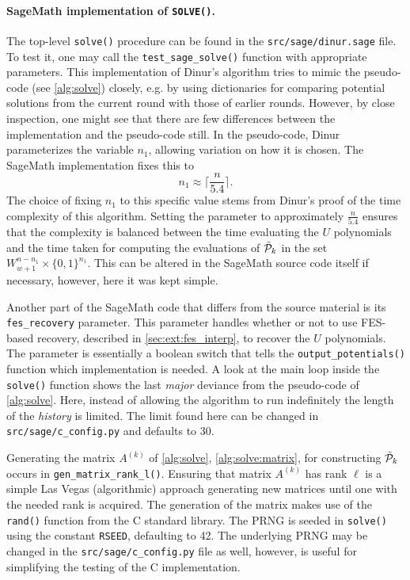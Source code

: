 \paragraph{SageMath implementation of \texttt{SOLVE()}.} The top-level \texttt{solve()} procedure can be found in the \texttt{src/sage/dinur.sage} file. To test it, one may call the \texttt{test\_sage\_solve()} function with appropriate parameters. This implementation of Dinur's algorithm tries to mimic the pseudo-code (see \cref{alg:solve}) closely, e.g. by using dictionaries for comparing potential solutions from the current round with those of earlier rounds. However, by close inspection, one might see that there are few differences between the implementation and the pseudo-code still. In the pseudo-code, Dinur parameterizes the variable $n_1$, allowing variation on how it is chosen. The SageMath implementation fixes this to 
$$
    n_1 \approx \lceil \frac{n}{5.4} \rceil.
$$
The choice of fixing $n_1$ to this specific value stems from Dinur's proof of the time complexity of this algorithm. Setting the parameter to approximately $\frac{n}{5.4}$ ensures that the complexity is balanced between the time evaluating the $U$ polynomials and the time taken for computing the evaluations of $\Tilde{\mathcal{P}}_k$ in the set $W^{n - n_1}_{w + 1} \times \{0,1\}^{n_1}$. This can be altered in the SageMath source code itself if necessary, however, here it was kept simple.

Another part of the SageMath code that differs from the source material is its 
\texttt{fes\_recovery} parameter. This parameter handles whether or not to use FES-based recovery, described in \cref{sec:ext:fes_interp}, to recover the $U$ polynomials. The parameter is essentially a boolean switch that tells the \texttt{output\_potentials()} function which implementation is needed. A look at the main loop inside the \texttt{solve()} function shows the last \textit{major} deviance from the pseudo-code of \cref{alg:solve}. Here, instead of allowing the algorithm to run indefinitely the length of the \textit{history} is limited. The limit found here can be changed in \texttt{src/sage/c\_config.py} and defaults to 30.

Generating the matrix $A^{(k)}$ of \cref{alg:solve}, \cref{alg:solve:matrix}, for constructing $\Tilde{\mathcal{P}}_k$ occurs in \texttt{gen\_matrix\_rank\_l()}. Ensuring that matrix $A^{(k)}$ has rank $\ell$ is a simple Las Vegas (algorithmic) approach generating new matrices until one with the needed rank is acquired. The generation of the matrix makes use of the \texttt{rand()} function from the C standard library. The PRNG is seeded in \texttt{solve()} using the constant \texttt{RSEED}, defaulting to 42. The underlying PRNG may be changed in the \texttt{src/sage/c\_config.py} file as well, however, is useful for simplifying the testing of the C implementation.

